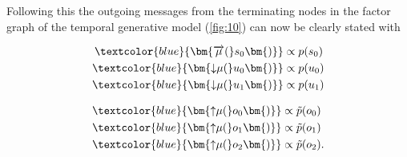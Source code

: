 Following this the outgoing messages from the terminating nodes in the factor graph of the temporal generative model (\cref{fig:10}) can now be clearly stated with

\noindent
\begin{minipage}[t]{0.5\textwidth}
    \setlength{\abovedisplayskip}{0pt}
    \setlength{\belowdisplayskip}{0pt}
    \begin{align}
        \textcolor{blue}{\bm{\overrightarrow{\mu}(}s_0\bm{)}} & \propto p(s_0) \\
        \textcolor{blue}{\bm{{\downarrow}{\mu}(}u_0\bm{)}}    & \propto p(u_0) \\
        \textcolor{blue}{\bm{{\downarrow}{\mu}(}u_1\bm{)}}    & \propto p(u_1)
    \end{align}
\end{minipage}\hfill
\begin{minipage}[t]{0.5\textwidth}
    \setlength{\abovedisplayskip}{0pt}
    \setlength{\belowdisplayskip}{0pt}
    \begin{align}
        \textcolor{blue}{\bm{{\uparrow}{\mu}(}o_0\bm{)}} & \propto \tilde{p}(o_0)  \\
        \textcolor{blue}{\bm{{\uparrow}{\mu}(}o_1\bm{)}} & \propto \tilde{p}(o_1)  \\
        \textcolor{blue}{\bm{{\uparrow}{\mu}(}o_2\bm{)}} & \propto \tilde{p}(o_2).
    \end{align}
\end{minipage}

